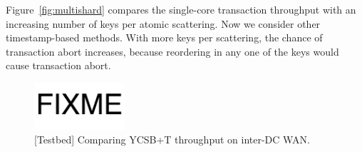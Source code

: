 Figure~\ref{fig:multishard} compares the single-core transaction throughput with an increasing number of keys per atomic scattering.
Now we consider other timestamp-based methods.
With more keys per scattering, the chance of transaction abort increases, because reordering in any one of the keys would cause transaction abort.

\iffalse
\begin{figure}[t]
\centering
\includegraphics[width=0.3\textwidth]{images/fixme.pdf}
\caption{[Testbed] Comparing YCSB+T throughput on inter-DC WAN.}
\vspace{-10pt}
\label{fig:ycsb-inter-dc}
\end{figure}

